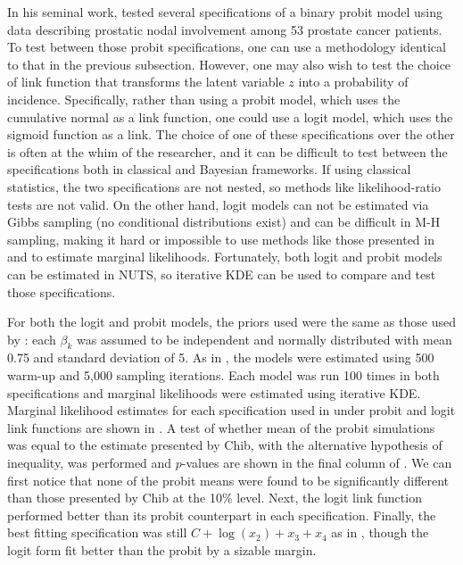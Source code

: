 \documentclass[twocolumn]{article}
\begin{document}
In his seminal work, \cite{Chib} tested several specifications of a binary probit model using data describing prostatic nodal involvement among 53 prostate cancer patients. To test between those probit specifications, one can use a methodology identical to that in the previous subsection. However, one may also wish to test the choice of link function that transforms the latent variable $z$ into a probability of incidence. Specifically, rather than using a probit model, which uses the cumulative normal as a link function, one could use a logit model, which uses the sigmoid function as a link. The choice of one of these specifications over the other is often at the whim of the researcher, and it can be difficult to test between the specifications both in classical and Bayesian frameworks. If using classical statistics, the two specifications are not nested, so methods like likelihood-ratio tests are not valid. On the other hand, logit models can not be estimated via Gibbs sampling (no conditional distributions exist) and can be difficult in M-H sampling, making it hard or impossible to use methods like those presented in \cite{Chib} and \cite{ChibJeliazkov} to estimate marginal likelihoods. Fortunately, both logit and probit models can be estimated in NUTS, so iterative KDE can be used to compare and test those specifications.

For both the logit and probit models, the priors used were the same as those used by \cite{Chib}: each $\beta_k$ was assumed to be independent and normally distributed with mean 0.75 and standard deviation of 5. As in \cite{Chib}, the models were estimated using 500 warm-up and 5,000 sampling iterations. Each model was run 100 times in both specifications and marginal likelihoods were estimated using iterative KDE. Marginal likelihood estimates for each specification used in \cite{Chib} under probit and logit link functions are shown in . A test of whether mean of the probit simulations was equal to the estimate presented by Chib, with the alternative hypothesis of inequality, was performed and $p$-values are shown in the final column of . We can first notice that none of the probit means were found to be significantly different than those presented by Chib at the 10\% level. Next, the logit link function performed better than its probit counterpart in each specification. Finally, the best fitting specification was still $C + \log(x_2) + x_3 + x_4$ as in \cite{Chib}, though the logit form fit better than the probit by a sizable margin.
\end{document}
